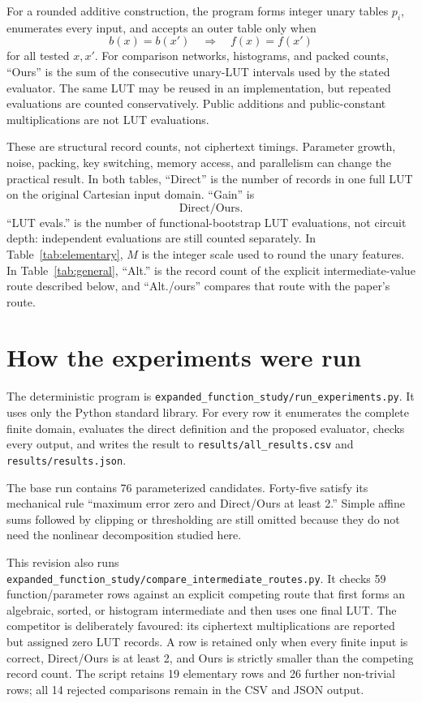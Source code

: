 \documentclass[10pt]{article}
\begin{document}
For a rounded additive construction, the program forms integer unary tables
\(p_i\), enumerates every input, and accepts an outer table only when
\[
 b(x)=b(x')\quad\Longrightarrow\quad f(x)=f(x')
\]
for all tested \(x,x'\).  For comparison networks, histograms, and packed
counts, ``Ours'' is the sum of the consecutive unary-LUT intervals used by the
stated evaluator.  The same LUT may be reused in an implementation, but
repeated evaluations are counted conservatively.  Public additions and
public-constant multiplications are not LUT evaluations.

These are structural record counts, not ciphertext timings.  Parameter growth,
noise, packing, key switching, memory access, and parallelism can change the
practical result.  In both tables, ``Direct'' is the number of records in one
full LUT on the original Cartesian input domain.  ``Gain'' is
\[
  \text{Direct}/\text{Ours}.
\]
``LUT evals.'' is the number of functional-bootstrap LUT evaluations, not
circuit depth: independent evaluations are still counted separately.  In
Table~\ref{tab:elementary}, \(M\) is the integer scale used to round the unary
features.  In Table~\ref{tab:general}, ``Alt.'' is the record count of the
explicit intermediate-value route described below, and ``Alt./ours'' compares
that route with the paper's route.

\section{How the experiments were run}

The deterministic program is
\texttt{expanded\_function\_study/run\_experiments.py}.  It uses only the
Python standard library.  For every row it enumerates the complete finite domain,
evaluates the direct definition and the proposed evaluator, checks every output,
and writes the result to \texttt{results/all\_results.csv} and
\texttt{results/results.json}.

The base run contains 76 parameterized candidates.  Forty-five satisfy its
mechanical rule ``maximum error zero and Direct/Ours at least 2.''  Simple
affine sums followed by clipping or thresholding are still omitted because they
do not need the nonlinear decomposition studied here.

This revision also runs
\texttt{expanded\_function\_study/compare\_intermediate\_routes.py}.  It checks
59 function/parameter rows against an explicit competing route that first forms
an algebraic, sorted, or histogram intermediate and then uses one final LUT.
The competitor is deliberately favoured: its ciphertext multiplications are
reported but assigned zero LUT records.  A row is retained only when every
finite input is correct, Direct/Ours is at least 2, and Ours is strictly smaller
than the competing record count.  The script retains 19 elementary rows and 26
further non-trivial rows; all 14 rejected comparisons remain in the CSV and
JSON output.
\end{document}
